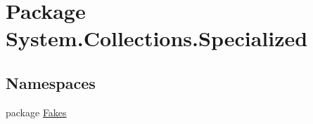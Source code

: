 \hypertarget{namespace_system_1_1_collections_1_1_specialized}{\section{Package System.\-Collections.\-Specialized}
\label{namespace_system_1_1_collections_1_1_specialized}
}
\subsection*{Namespaces}
\begin{DoxyCompactItemize}
\item 
package \hyperlink{namespace_system_1_1_collections_1_1_specialized_1_1_fakes}{Fakes}
\end{DoxyCompactItemize}
